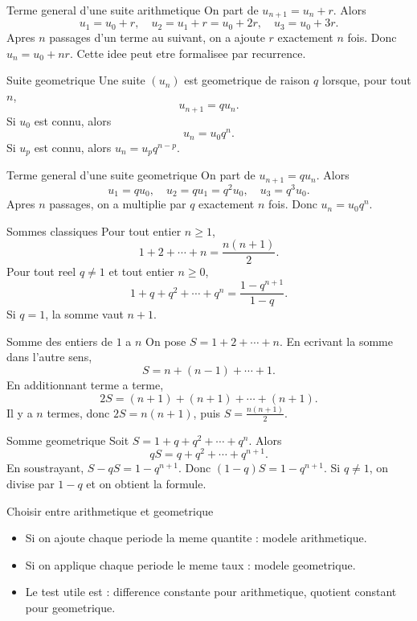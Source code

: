 \documentclass[11pt,a4paper]{article}
\begin{document}
\begin{boitepreuve}{Terme general d'une suite arithmetique}
On part de $u_{n+1}=u_n+r$. Alors
\[
u_1=u_0+r,\quad u_2=u_1+r=u_0+2r,\quad u_3=u_0+3r.
\]
Apres $n$ passages d'un terme au suivant, on a ajoute $r$ exactement $n$ fois. Donc $u_n=u_0+nr$. Cette idee peut etre formalisee par recurrence.
\end{boitepreuve}

\begin{boitecours}{Suite geometrique}
Une suite $(u_n)$ est geometrique de raison $q$ lorsque, pour tout $n$,
\[
u_{n+1}=q u_n.
\]
Si $u_0$ est connu, alors
\[
u_n=u_0q^n.
\]
Si $u_p$ est connu, alors $u_n=u_pq^{n-p}$.
\end{boitecours}

\begin{boitepreuve}{Terme general d'une suite geometrique}
On part de $u_{n+1}=qu_n$. Alors
\[
u_1=qu_0,\quad u_2=q u_1=q^2u_0,\quad u_3=q^3u_0.
\]
Apres $n$ passages, on a multiplie par $q$ exactement $n$ fois. Donc $u_n=u_0q^n$.
\end{boitepreuve}

\begin{boitecours}{Sommes classiques}
Pour tout entier $n\ge1$,
\[
1+2+\cdots+n=\frac{n(n+1)}2.
\]
Pour tout reel $q\ne1$ et tout entier $n\ge0$,
\[
1+q+q^2+\cdots+q^n=\frac{1-q^{n+1}}{1-q}.
\]
Si $q=1$, la somme vaut $n+1$.
\end{boitecours}

\begin{boitepreuve}{Somme des entiers de $1$ a $n$}
On pose $S=1+2+\cdots+n$. En ecrivant la somme dans l'autre sens,
\[
S=n+(n-1)+\cdots+1.
\]
En additionnant terme a terme,
\[
2S=(n+1)+(n+1)+\cdots+(n+1).
\]
Il y a $n$ termes, donc $2S=n(n+1)$, puis $S=\frac{n(n+1)}2$.
\end{boitepreuve}

\begin{boitepreuve}{Somme geometrique}
Soit $S=1+q+q^2+\cdots+q^n$. Alors
\[
qS=q+q^2+\cdots+q^{n+1}.
\]
En soustrayant, $S-qS=1-q^{n+1}$. Donc $(1-q)S=1-q^{n+1}$. Si $q\ne1$, on divise par $1-q$ et on obtient la formule.
\end{boitepreuve}

\begin{boitemethode}{Choisir entre arithmetique et geometrique}
\begin{itemize}
  \item Si on ajoute chaque periode la meme quantite : modele arithmetique.
  \item Si on applique chaque periode le meme taux : modele geometrique.
  \item Le test utile est : difference constante pour arithmetique, quotient constant pour geometrique.
\end{itemize}
\end{boitemethode}
\end{document}
